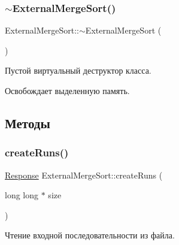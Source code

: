 \subsubsection{\texorpdfstring{$\sim$\+External\+Merge\+Sort()}{~ExternalMergeSort()}}
{\footnotesize\ttfamily External\+Merge\+Sort\+::$\sim$\+External\+Merge\+Sort (\begin{DoxyParamCaption}{ }\end{DoxyParamCaption})\hspace{0.3cm}{\ttfamily [virtual]}}



Пустой виртуальный деструктор класса. 

Освобождает выделенную память. 

\subsection{Методы}
\hypertarget{class_external_merge_sort_aae72743234c39c35a3460fecefa3a1f0}{}\label{class_external_merge_sort_aae72743234c39c35a3460fecefa3a1f0} 
\subsubsection{\texorpdfstring{create\+Runs()}{createRuns()}}
{\footnotesize\ttfamily \hyperlink{_structures_8h_ab3500e5d3c915d1b5cc58dcab8673fd4}{Response} External\+Merge\+Sort\+::create\+Runs (\begin{DoxyParamCaption}\item[{long long $\ast$}]{size }\end{DoxyParamCaption})\hspace{0.3cm}{\ttfamily [private]}}



Чтение входной последовательности из файла. 


